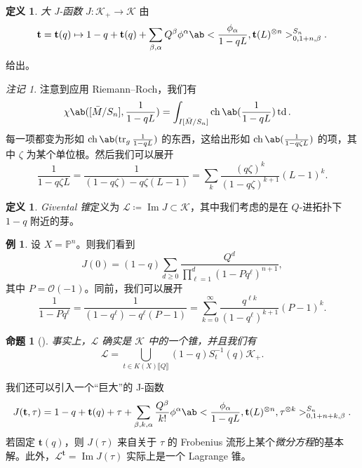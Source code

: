 \documentclass{amsart}
\newtheorem{prop}[thm]{命题}
\theoremstyle{definition}
\newtheorem{defn}[thm]{定义}
\newtheorem{exm}[thm]{例}
\theoremstyle{remark}
\newtheorem{rmk}[thm]{注记}
\theoremstyle{plain}
\theoremstyle{definition}
\theoremstyle{remark}
\DeclareMathOperator{\Ima}{Im}
\renewcommand{\P}{\mathbb{P}}
\newcommand{\mc}[1]{\mathcal{#1}}
\newcommand{\on}[1]{\operatorname{#1}}
\newcommand{\1}{\mathbf{1}}
\newcommand{\2}{\mathbf{2}}
\newcommand{\3}{\mathbf{3}}
\newcommand{\ps}[1]{\llbracket #1 \rrbracket}
\begin{document}
\begin{defn}
    \textit{大 J-函数} \(J \colon \mc{K}_+ \to \mc{K}\) 由
    \[ \mathbf{t} = \mathbf{t}(q) \mapsto 1 - q + \mathbf{t}(q) + \sum_{\beta, \alpha} Q^{\beta} \phi^{\alpha} \ab< \frac{\phi_{\alpha}}{1-qL}, \mathbf{t}(L)^{\otimes n}>_{0, 1+n, \beta}^{S_n}. \]
    给出。
\end{defn}

\begin{rmk}
    注意到应用 Riemann–Roch，我们有
    \begin{align*}
        \chi\ab([\bar{M}/S_n], \frac{1}{1-qL}) &= \int_{I[\bar{M}/S_n]} \on{ch}\ab(\frac{1}{1-qL}) \on{td}.
    \end{align*}
    每一项都变为形如 \(\on{ch}\ab(\on{tr}_g \frac{1}{1-qL})\) 的东西，这给出形如 \(\on{ch}\ab(\frac{1}{1-q\zeta L})\) 的项，其中 \(\zeta\) 为某个单位根。然后我们可以展开
    \[ \frac{1}{1-q\zeta L} = \frac{1}{(1-q \zeta) - q\zeta (L-1)} = \sum_k \frac{(q\zeta)^k}{(1-q\zeta)^{k+1}}(L-1)^k. \]
\end{rmk}

\begin{defn}
    \textit{Givental 锥}定义为 \(\mc{L} \coloneqq \Ima J \subset \mc{K}\)，其中我们考虑的是在 \(Q\)-进拓扑下 \(1-q\) 附近的芽。
\end{defn}

\begin{exm}
    设 \(X = \P^n\)。则我们看到
    \[ J(0) = (1-q) \sum_{d \geq 0} \frac{Q^d}{\prod_{\ell=1}^d (1-Pq^{\ell})^{n+1}}, \]
    其中 \(P = \mc{O}(-1)\)。同前，我们可以展开
    \[ \frac{1}{1-P q^{\ell}} = \frac{1}{(1-q^{\ell}) - q^{\ell}(P-1)} = \sum_{k=0}^{\infty} \frac{q^{\ell k}}{(1-q^{\ell})^{k+1}}(P-1)^k. \]
\end{exm}

\begin{prop}[{\cite{GiventalK7}}]
    事实上，\(\mc{L}\) 确实是 \(\mc{K}\) 中的一个锥，并且我们有
    \[ \mc{L} = \bigcup_{t \in K(X)\ps{Q}} (1-q) S_{t}^{-1}(q) \mc{K}_+. \]
\end{prop}

我们还可以引入一个``巨大''的 J-函数
\[ J(\mathbf{t}, \tau) = 1-q + \mathbf{t}(q) + \tau + \sum_{\beta, k, \alpha} \frac{Q^{\beta}}{k!} \phi^{\alpha} \ab< \frac{\phi_{\alpha}}{1-qL}, \mathbf{t}(L)^{\otimes n}, \tau^{\otimes k}>_{0,1+n+k,\beta}^{S_n}. \]
若固定 \(\mathbf{t}(q)\)，则 \(J(\tau)\) 来自关于 \(\tau\) 的 Frobenius 流形上某个\textit{微分方程}的基本解。此外，\(\mc{L}^{\mathbf{t}}=  \Ima J(\tau)\) 实际上是一个 Lagrange 锥。
\end{document}
